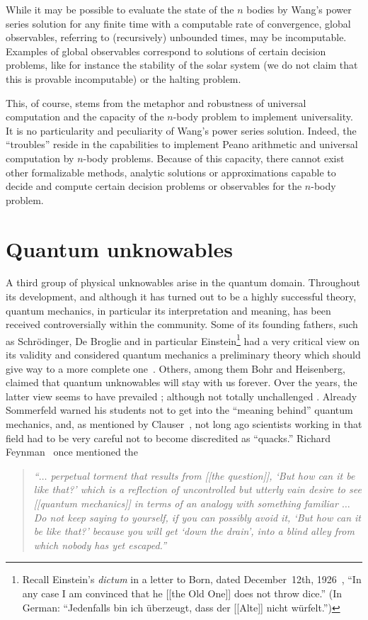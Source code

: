 \documentclass[rmp,amsfonts,showpacs,showkeys,twocolumn]{revtex4}
\begin{document}
While it may be possible to evaluate
the state of the $n$ bodies by Wang's power series solution
for any finite time with a computable rate of convergence,
global observables, referring to (recursively) unbounded times, may be incomputable.
Examples of global observables correspond to solutions of certain decision problems,
like for instance the stability of the solar system (we do not claim that this is provable incomputable) or the
halting problem.

This, of course,
stems from the metaphor and robustness of universal computation
and the capacity of the $n$-body problem to implement universality.
It is no particularity and peculiarity of Wang's power series solution.
Indeed, the ``troubles'' reside in the capabilities to implement Peano arithmetic and
universal computation by $n$-body problems.
Because of this capacity, there cannot exist other formalizable methods,
analytic solutions or approximations capable to decide and compute certain decision problems
or observables for the $n$-body problem.

\section{Quantum unknowables}


A third group of physical unknowables arise in the quantum domain.
Throughout its development, and although it has turned out to be a highly successful theory,
quantum mechanics, in particular its interpretation and meaning,
has been received controversially within the community.
Some of its founding fathers, such as Schr\"odinger,
De Broglie and in particular Einstein\footnote{
Recall Einstein's {\it dictum} in a letter to Born, dated December~12th, 1926~\cite[p.~113]{born-69},
``In any case I am convinced that he [[the Old One]] does not throw dice.''
(In German: ``Jedenfalls bin ich {\"{u}}berzeugt, dass der [[Alte]] nicht w{\"{u}}rfelt.'')} had a very critical view on its
validity and considered quantum mechanics a preliminary theory which should give
way to a more complete one~\cite{epr}.
Others, among them Bohr and Heisenberg,
claimed that quantum unknowables will stay with us forever.
Over the years, the latter view seems to have prevailed
\cite{fuchs-peres}; although not totally unchallenged
\cite{jammer:66,jammer1,jammer-92}.
Already Sommerfeld warned his students not to get
into the ``meaning behind'' quantum mechanics,
and, as mentioned by Clauser~\cite{clauser-talkvie},
not long ago scientists working in that field
had to be very careful not to become discredited as ``quacks.''
Richard Feynman~\cite[p. 129]{feynman-law}
once mentioned the
\begin{quote}
{\em ``$\ldots$ perpetual torment that results
from [[the question]], `But how can it be like that?' which
is a reflection of uncontrolled but utterly vain desire to see
[[quantum mechanics]] in terms of an analogy with something familiar
$\ldots$
Do not keep saying to yourself, if you can possibly avoid it,
`But how can it be like that?'
because you will get `down the drain', into a blind alley from which nobody has yet
escaped.''}
\end{quote}
\end{document}
